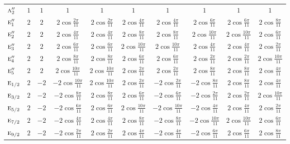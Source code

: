 \documentclass[10pt,a4paper]{article}
\makeatletter
\def\grouprule#1#2{\noalign{\marks\LTgroupmarks{\the\belowrulesep}\nobreak\vskip#1%
  \vskip\aboverulesep}\multispan\LT@cols\unskip{\leaders\hrule\@height#2\hfill\kern\z@}\cr
  \noalign{\penalty\LTrulebreak\vskip\belowrulesep\global\@lastruleclass\z@}}
\numberwithin{equation}{section}
\newcommand{\irr}[1]{\text{\normalfont\scshape #1}}
\makeatother
\begin{document}
{{\begin{longtable}{@{}lccccccccc@{}}
$\irr{a}_{2}''$ & $1$ & $1$ & $1$ & $1$ & $1$ & $1$ & $1$ & $1$ & $1$\\
$\irr{e}_{1}''$ & $2$ & $2$ & $2\cos\tfrac{2\pi}{11}$ & $2\cos\tfrac{2\pi}{11}$ & $2\cos\tfrac{4\pi}{11}$ & $2\cos\tfrac{4\pi}{11}$ & $2\cos\tfrac{6\pi}{11}$ & $2\cos\tfrac{6\pi}{11}$ & $2\cos\tfrac{8\pi}{11}$\\
$\irr{e}_{2}''$ & $2$ & $2$ & $2\cos\tfrac{4\pi}{11}$ & $2\cos\tfrac{4\pi}{11}$ & $2\cos\tfrac{8\pi}{11}$ & $2\cos\tfrac{8\pi}{11}$ & $2\cos\tfrac{10\pi}{11}$ & $2\cos\tfrac{10\pi}{11}$ & $2\cos\tfrac{6\pi}{11}$\\
$\irr{e}_{3}''$ & $2$ & $2$ & $2\cos\tfrac{6\pi}{11}$ & $2\cos\tfrac{6\pi}{11}$ & $2\cos\tfrac{10\pi}{11}$ & $2\cos\tfrac{10\pi}{11}$ & $2\cos\tfrac{4\pi}{11}$ & $2\cos\tfrac{4\pi}{11}$ & $2\cos\tfrac{2\pi}{11}$\\
$\irr{e}_{4}''$ & $2$ & $2$ & $2\cos\tfrac{8\pi}{11}$ & $2\cos\tfrac{8\pi}{11}$ & $2\cos\tfrac{6\pi}{11}$ & $2\cos\tfrac{6\pi}{11}$ & $2\cos\tfrac{2\pi}{11}$ & $2\cos\tfrac{2\pi}{11}$ & $2\cos\tfrac{10\pi}{11}$\\
$\irr{e}_{5}''$ & $2$ & $2$ & $2\cos\tfrac{10\pi}{11}$ & $2\cos\tfrac{10\pi}{11}$ & $2\cos\tfrac{2\pi}{11}$ & $2\cos\tfrac{2\pi}{11}$ & $2\cos\tfrac{8\pi}{11}$ & $2\cos\tfrac{8\pi}{11}$ & $2\cos\tfrac{4\pi}{11}$\\
\grouprule{0pt}{\lightrulewidth}
$\irr{e}_{1/2}$ & $2$ & $-2$ & $-2\cos\tfrac{10\pi}{11}$ & $2\cos\tfrac{10\pi}{11}$ & $2\cos\tfrac{2\pi}{11}$ & $-2\cos\tfrac{2\pi}{11}$ & $-2\cos\tfrac{8\pi}{11}$ & $2\cos\tfrac{8\pi}{11}$ & $2\cos\tfrac{4\pi}{11}$\\
$\irr{e}_{3/2}$ & $2$ & $-2$ & $-2\cos\tfrac{8\pi}{11}$ & $2\cos\tfrac{8\pi}{11}$ & $2\cos\tfrac{6\pi}{11}$ & $-2\cos\tfrac{6\pi}{11}$ & $-2\cos\tfrac{2\pi}{11}$ & $2\cos\tfrac{2\pi}{11}$ & $2\cos\tfrac{10\pi}{11}$\\
$\irr{e}_{5/2}$ & $2$ & $-2$ & $-2\cos\tfrac{6\pi}{11}$ & $2\cos\tfrac{6\pi}{11}$ & $2\cos\tfrac{10\pi}{11}$ & $-2\cos\tfrac{10\pi}{11}$ & $-2\cos\tfrac{4\pi}{11}$ & $2\cos\tfrac{4\pi}{11}$ & $2\cos\tfrac{2\pi}{11}$\\
$\irr{e}_{7/2}$ & $2$ & $-2$ & $-2\cos\tfrac{4\pi}{11}$ & $2\cos\tfrac{4\pi}{11}$ & $2\cos\tfrac{8\pi}{11}$ & $-2\cos\tfrac{8\pi}{11}$ & $-2\cos\tfrac{10\pi}{11}$ & $2\cos\tfrac{10\pi}{11}$ & $2\cos\tfrac{6\pi}{11}$\\
$\irr{e}_{9/2}$ & $2$ & $-2$ & $-2\cos\tfrac{2\pi}{11}$ & $2\cos\tfrac{2\pi}{11}$ & $2\cos\tfrac{4\pi}{11}$ & $-2\cos\tfrac{4\pi}{11}$ & $-2\cos\tfrac{6\pi}{11}$ & $2\cos\tfrac{6\pi}{11}$ & $2\cos\tfrac{8\pi}{11}$\\

\end{longtable}}}
\end{document}
